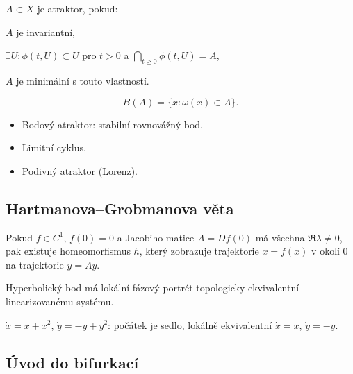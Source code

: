 \begin{definition}[Atraktor]
$A\subset X$ je atraktor, pokud:
\begin{romanenum}
\item $A$ je invariantní,
\item $\exists U: \phi(t,U)\subset U$ pro $t>0$ a $\bigcap_{t\ge0}\phi(t,U)=A$,
\item $A$ je minimální s touto vlastností.
\end{romanenum}
\end{definition}

\begin{definition}
\[
B(A)=\{x:\omega(x)\subset A\}.
\]
\end{definition}

\begin{example}
\begin{itemize}
\item Bodový atraktor: stabilní rovnovážný bod,
\item Limitní cyklus,
\item Podivný atraktor (Lorenz).
\end{itemize}
\end{example}

\spc

\subsection{Hartmanova–Grobmanova věta}
\label{sec:veta-linearizace}

\begin{theorem}
Pokud $f\in C^1$, $f(0)=0$ a Jacobiho matice $A=Df(0)$ má všechna $\Re\lambda\ne0$, pak existuje homeomorfismus $h$, který zobrazuje trajektorie $\dot{x}=f(x)$ v okolí $0$ na trajektorie $\dot{y}=Ay$.
\end{theorem}

\begin{remark}
Hyperbolický bod má lokální fázový portrét topologicky ekvivalentní linearizovanému systému.
\end{remark}

\begin{example}[Sedlo]
$\dot{x}=x+x^2$, $\dot{y}=-y+y^2$: počátek je sedlo, lokálně ekvivalentní $\dot{x}=x$, $\dot{y}=-y$.
\end{example}

\spc

\subsection{Úvod do bifurkací}
\label{sec:uvod-bifurkace}

